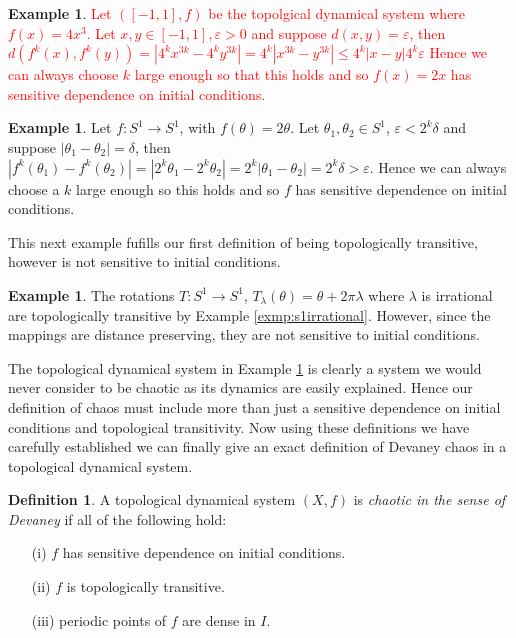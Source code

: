 \documentclass[11pt,a4paper,oneside]{memoir}
\theoremstyle{plain}
\theoremstyle{definition}
\newtheorem{defn}[thm]{Definition}
\newtheorem{exmp}[thm]{Example}
\begin{document}
\begin{exmp} \label{exmp:2x}
    \textcolor{red}{
    Let $([-1, 1], f)$ be the topolgical dynamical system where $f(x) = 4x^3$. Let $x, y \in [-1, 1], \varepsilon > 0$ and suppose $d(x, y) = \varepsilon$, then $d(f^k(x), f^k(y)) = |4^kx^{3k} - 4^ky^{3k}| = 4^k|x^{3k} - y^{3k}| \leq 4^k|x - y|  4^k \varepsilon$
    Hence we can always choose $k$ large enough so that this holds and so $f(x) = 2x$ has sensitive dependence on initial conditions.
    }
\end{exmp}

\begin{exmp} \label{exmp:rotations}
    Let $f: S^1 \to S^1$, with $f(\theta) = 2\theta$. Let $\theta_1, \theta_2 \in S^1$, $\varepsilon < 2^k \delta$ and suppose $|\theta_1 - \theta_2| = \delta$, then $\left\lvert f^k(\theta_1) - f^k(\theta_2)\right\rvert = \left\lvert 2^k\theta_1 - 2^k\theta_2 \right\rvert = 2^k \left\lvert \theta_1 - \theta_2 \right\rvert = 2^k \delta > \varepsilon$. Hence we can always choose a $k$ large enough so this holds and so $f$ has sensitive dependence on initial conditions.
\end{exmp}

This next example fufills our first definition of being topologically transitive, however is not sensitive to initial conditions.
\begin{exmp}
    The rotations $T: S^1 \to S^1$, $T_\lambda(\theta) = \theta + 2\pi \lambda$ where $\lambda$ is irrational are topologically transitive by Example \ref{exmp:s1irrational}. However, since the mappings are distance preserving, they are not sensitive to initial conditions.
\end{exmp}

The topological dynamical system in Example \ref{exmp:2x} is clearly a system we would never consider to be chaotic as its dynamics are easily explained. Hence our definition of chaos must include more than just a sensitive dependence on initial conditions and topological transitivity. Now using these definitions we have carefully established we can finally give an exact definition of Devaney chaos in a topological dynamical system.

\begin{defn}
    A topological dynamical system $(X, f)$ is \emph{chaotic in the sense of Devaney} if all of the following hold:
    \begin{itemize}
        \item[(i)]$f$ has sensitive dependence on initial conditions.
        \item[(ii)]$f$ is topologically transitive.
        \item[(iii)]periodic points of $f$ are dense in $I$.
    \end{itemize}
\end{defn}
\end{document}

